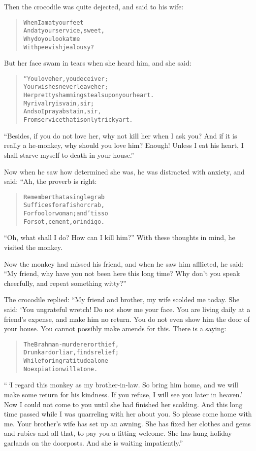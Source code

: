 \documentclass[article, twoside, 14pt]{memoir}
\renewenvironment{verbatim}{%
\begin{quote}%
\vskip -10pt%
\begin{alltt}\normalfont\large}{\end{alltt}%
\end{quote}%
\vskip -10pt
} %
\begin{document}
Then the crocodile was quite dejected, and said to his wife:

\begin{verbatim}
When I am at your feet
And at your service, sweet,
Why do you look at me
With peevish jealousy?
\end{verbatim}
But her face swam in tears when she heard him, and she said:

\begin{verbatim}
“You love her, you deceiver;
Your wishes never leave her;
Her pretty shamming steals upon your heart.
    My rivalry is vain, sir;
    And so I pray abstain, sir,
From service that is only tricky art.
\end{verbatim}
``Besides, if you do not love her, why not kill her when I ask you? And if it is really a he-monkey, why should you love him? Enough! Unless I eat his heart, I shall starve myself to death in your house.''

Now when he saw how determined she was, he was distracted with
anxiety, and said: “Ah, the proverb is right:

\begin{verbatim}
Remember that a single grab
Suffices for a fish or crab,
For fool or woman; and 'tis so
For sot, cement, or indigo.
\end{verbatim}
``Oh, what shall I do? How can I kill him?'' With these thoughts in
mind, he visited the monkey.

Now the monkey had missed his friend, and when he saw him
afflicted, he said:
``My friend, why have you not been here this long time? Why don't you speak cheerfully, and repeat something witty?''

The crocodile replied: “My friend and brother, my wife scolded me
today. She said: ‘You ungrateful wretch! Do not show me your face.
You are living daily at a friend's expense, and make him no return.
You do not even show him the door of your house. You cannot
possibly make amends for this. There is a saying:

\begin{verbatim}
The Brahman-murderer or thief,
Drunkard or liar, finds relief;
While for ingratitude alone
No expiation will atone.
\end{verbatim}
``\,`I regard this monkey as my brother-in-law. So bring him home, and we will make some return for his kindness. If you refuse, I will see you later in heaven.' Now I could not come to you until she had finished her scolding. And this long time passed while I was quarreling with her about you. So please come home with me. Your brother's wife has set up an awning. She has fixed her clothes and gems and rubies and all that, to pay you a fitting welcome. She has hung holiday garlands on the doorposts. And she is waiting impatiently.''
\end{document}
